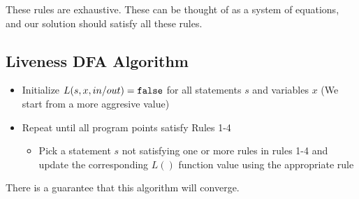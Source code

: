 These rules are exhaustive. These can be thought of as a system of equations, and our solution should satisfy all these rules.

\subsection{Liveness DFA Algorithm}
\begin{itemize}
    \item Initialize $L(s, x, in/out) = {\tt false}$ for all statements $s$ and variables $x$ (We start from a more aggresive value)
    \item Repeat until all program points satisfy Rules 1-4
    \begin{itemize}
        \item Pick a statement $s$ not satisfying one or more rules in rules 1-4 and update the corresponding $L()$ function value using the appropriate rule
    \end{itemize}
\end{itemize}

There is a guarantee that this algorithm will converge.
